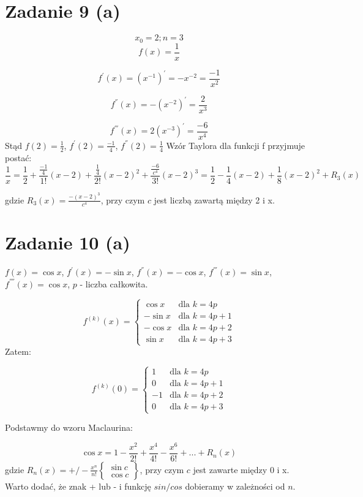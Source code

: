 \documentclass{article}
\begin{document}
\section{Zadanie 9 (a)}

$$x_0 = 2; n = 3$$
$$f(x) = \frac{1}{x}$$

$$f^{'}(x) = (x^{-1})^{'} = -x^{-2} = \frac{-1}{x^2}$$

$$f^{''}(x) = -(x^{-2})^{'} = \frac{2}{x^3} $$

$$f^{'''}(x) = 2(x^{-3})^{'} = \frac{-6}{x^4} $$ \newline
Stąd $f(2) = \frac{1}{2}$, $f^{'}(2) = \frac{-1}{4}$,
$f^{''}(2) = \frac{1}{4}$ \newline
Wzór Taylora dla funkcji f przyjmuje postać: \newline
$$\frac{1}{x} = \frac{1}{2} +\frac{\frac{-1}{4}}{1!}(x-2) + \frac{\frac{1}{4}}{2!}(x-2)^{2} + \frac{\frac{-6}{c^{4}}}{3!}(x-2)^{3} = \frac{1}{2} -\frac{1}{4}(x-2)+\frac{1}{8}(x-2)^{2} + R_{3}(x) $$ \newline

gdzie $R_{3}(x) = \frac{-(x-2)^3}{c^4}$, przy czym $c$ jest liczbą zawartą między 2 i x.

\section{Zadanie 10 (a)}

$f(x) = \cos{x}$, $f^{'}(x) = -\sin{x}$, $f^{''}(x) = -\cos{x}$, $f^{'''}(x) = \sin{x}$, $f^{''''}(x) = \cos{x}$, \newline $p$ - liczba całkowita.
\newline

$$f^{(k)}(x)=\left\{ \begin{array}{rl}
\cos{x} & \textrm{dla $k = 4p$} \\
-\sin{x} & \textrm{dla $k = 4p+1$}\\
-\cos{x} & \textrm{dla $k = 4p+2$}\\
\sin{x} & \textrm{dla $k = 4p+3$}\end{array}$$   Zatem: \newline

$$f^{(k)}(0)=\left\{ \begin{array}{rl}
1 & \textrm{dla $k = 4p$} \\
0 & \textrm{dla $k = 4p+1$}\\
-1 & \textrm{dla $k = 4p+2$}\\
0 & \textrm{dla $k = 4p+3$}\end{array}$$ \newline

Podstawmy do wzoru Maclaurina:

$$\cos{x} = 1 - \frac{x^2}{2!} + \frac{x^4}{4!} - \frac{x^6}{6!} + ... + R_{n}(x) $$ gdzie $R_{n}(x) = +/- \frac{x^n}{n!}\left\{ \begin{array}{rl}
\sin{c} \\
\cos{c} \end{array}\right\}$, przy czym $c$ jest zawarte między 0 i x. Warto dodać, że znak + lub - i funkcję $sin/cos$ dobieramy w zależności od $n$.
\end{document}
